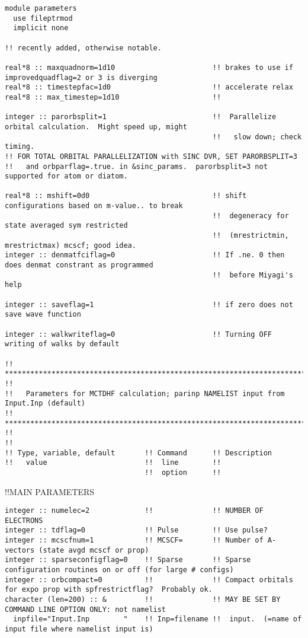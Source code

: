 \begin{verbatim}
module parameters
  use fileptrmod
  implicit none

!! recently added, otherwise notable. 

real*8 :: maxquadnorm=1d10                       !! brakes to use if improvedquadflag=2 or 3 is diverging
real*8 :: timestepfac=1d0                        !! accelerate relax
real*8 :: max_timestep=1d10                      !!

integer :: parorbsplit=1                         !!  Parallelize orbital calculation.  Might speed up, might
                                                 !!   slow down; check timing.
!! FOR TOTAL ORBITAL PARALLELIZATION with SINC DVR, SET PARORBSPLIT=3
!!   and orbparflag=.true. in &sinc_params.  parorbsplit=3 not supported for atom or diatom.

real*8 :: mshift=0d0                             !! shift configurations based on m-value.. to break 
                                                 !!  degeneracy for state averaged sym restricted
                                                 !!  (mrestrictmin, mrestrictmax) mcscf; good idea.
integer :: denmatfciflag=0                       !! If .ne. 0 then does denmat constrant as programmed
                                                 !!  before Miyagi's help

integer :: saveflag=1                            !! if zero does not save wave function

integer :: walkwriteflag=0                       !! Turning OFF writing of walks by default

!! *********************************************************************************************************** !!
!!   Parameters for MCTDHF calculation; parinp NAMELIST input from Input.Inp (default)
!! *********************************************************************************************************** !!
!!
!! Type, variable, default       !! Command      !! Description 
!!   value                       !!  line        !! 
                                 !!  option      !!
\end{verbatim}
!!{\large \quad MAIN PARAMETERS }
\begin{verbatim}
integer :: numelec=2             !!              !! NUMBER OF ELECTRONS
integer :: tdflag=0              !! Pulse        !! Use pulse?
integer :: mcscfnum=1            !! MCSCF=       !! Number of A-vectors (state avgd mcscf or prop)
integer :: sparseconfigflag=0    !! Sparse       !! Sparse configuration routines on or off (for large # configs)
integer :: orbcompact=0          !!              !! Compact orbitals for expo prop with spfrestrictflag?  Probably ok.
character (len=200) :: &         !!              !! MAY BE SET BY COMMAND LINE OPTION ONLY: not namelist
  inpfile="Input.Inp        "    !! Inp=filename !!  input.  (=name of input file where namelist input is)
\end{verbatim}
